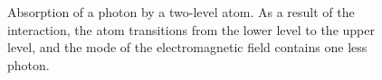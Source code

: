 \begin{figure}
\centering



\caption{Absorption of a photon by a two-level atom. As a result of the
  interaction, the atom transitions from the lower level to the upper level, and the mode
  of the electromagnetic field contains one less photon.}
\label{figPart1Ch2_3}
\end{figure}